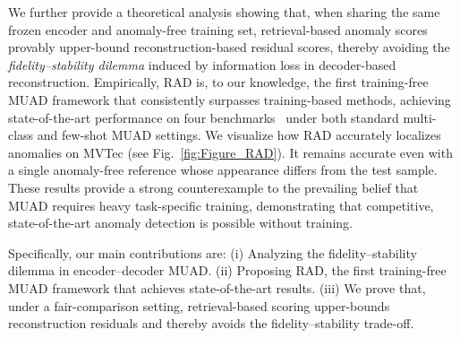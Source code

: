 \documentclass{article}
\theoremstyle{plain}
\theoremstyle{definition}
\theoremstyle{remark}
\begin{document}
We further provide a theoretical analysis showing that, when sharing the same frozen encoder and anomaly-free training set, retrieval-based anomaly scores provably upper-bound reconstruction-based residual scores, thereby avoiding the \emph{fidelity–stability dilemma} induced by information loss in decoder-based reconstruction. Empirically, RAD is, to our knowledge, the first training-free MUAD framework that consistently surpasses training-based methods, achieving state-of-the-art performance on four benchmarks~\cite{bergmann2019mvtec,zou2022spot,wang2024real,mchard20253d} under both standard multi-class and few-shot MUAD settings. We visualize how RAD accurately localizes anomalies on MVTec (see Fig.~\ref{fig:Figure_RAD}).
It remains accurate even with a single anomaly-free reference whose appearance differs from the test sample. These results provide a strong counterexample to the prevailing belief that MUAD requires heavy task-specific training, demonstrating that competitive, state-of-the-art anomaly detection is possible without training. %


Specifically, our main contributions are: (i) Analyzing the fidelity–stability dilemma in encoder–decoder MUAD.
(ii) Proposing RAD, the first training-free MUAD framework that achieves state-of-the-art results.
(iii) We prove that, under a fair-comparison setting, retrieval-based scoring upper-bounds reconstruction residuals and thereby avoids the fidelity–stability trade-off.





\end{document}
